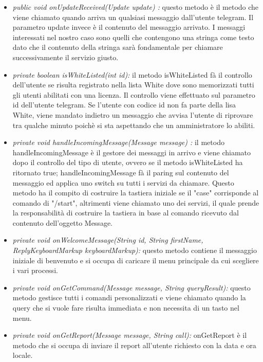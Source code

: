 \begin{itemize}
\item \textit{public void onUpdateReceived(Update update) :}  
questo metodo è il metodo che viene chiamato quando arriva un qualsiasi messaggio dall'utente telegram. Il parametro update invece è il contenuto del messaggio arrivato. I messaggi interessati nel nostro caso sono quelli che contengono una stringa come testo dato che il contenuto della stringa sarà fondamentale per chiamare successivamente il servizio giusto.

\item \textit{private boolean isWhiteListed(int id):}
il metodo isWhiteListed fà il controllo dell'utente se risulta registrato nella lista White dove sono memorizzati tutti gli utenti abilitati con una licenza. Il controllo viene effettuato sul parametro id dell'utente telegram. Se l'utente con codice id non fa parte della lisa White, viene mandato indietro un messaggio che avvisa l'utente di riprovare tra qualche minuto poichè si sta aspettando che un amministratore lo abiliti. 

\item \textit{private void handleIncomingMessage(Message message) :}
il metodo handleIncomingMessage è il gestore dei messaggi in arrivo e viene chiamato dopo il controllo del tipo di utente, ovvero se il metodo isWhiteListed ha ritornato true; 
handleIncomingMessage fà il paring sul contenuto del messaggio ed applica uno switch su  tutti i servizi da chiamare. Questo metodo ha il compito di costruire la tastiera iniziale se il "case" corrisponde al comando di "/start", altrimenti viene chiamato uno dei servizi, il quale prende la responsabilità di costruire la tastiera in base al comando ricevuto dal contenuto dell'oggetto Message.

	 \item \textit{private void onWelcomeMessage(String id, String firstName, ReplyKeyboardMarkup keyboardMarkup):} questo metodo contiene il messaggio iniziale di benvenuto e si occupa di caricare il menu principale da cui scegliere i vari processi. 

 \item \textit{private void onGetCommand(Message message, String queryResult):}
questo metodo gestisce tutti i comandi personalizzati e viene chiamato quando la query che si vuole fare risulta immediata e non necessita di un tasto nel menu.

 \item \textit{private void onGetReport(Message message, String call):}
onGetReport è il metodo che si occupa di inviare il report all’utente richiesto con la data e ora locale.


\end{itemize}

